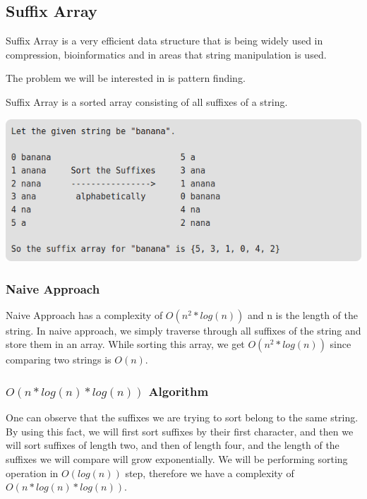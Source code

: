 \documentclass[12pt]{article}
\begin{document}
        \subsection{Suffix Array}
        Suffix Array is a very efficient data structure that is being widely used in compression, bioinformatics and in areas that string manipulation is used. 
        
        The problem we will be interested in is pattern finding.
        
        Suffix Array is a sorted array consisting of all suffixes of a string.
        
        \includegraphics[width=\linewidth/2]{suffix_array1.png}
        
        \newpage
        
        \subsubsection{Naive Approach}
        
        Naive Approach has a complexity of $O(n^2 * log(n))$ and n is the length of the string. In naive approach, we simply traverse through all suffixes of the string and store them in an array. While sorting this array, we get $O(n^2 * log(n))$ since comparing two strings is $O(n)$.
        
        \subsubsection{$O(n * log(n) * log(n))$ Algorithm}
        
        One can observe that the suffixes we are trying to sort belong to the same string. By using this fact, we will first sort suffixes by their first character, and then we will sort suffixes of length two, and then of length four, and the length of the suffixes we will compare will grow exponentially. We will be performing sorting operation in $O(log(n))$ step, therefore we have a complexity of $O(n * log(n) * log(n))$.
        
\end{document}
